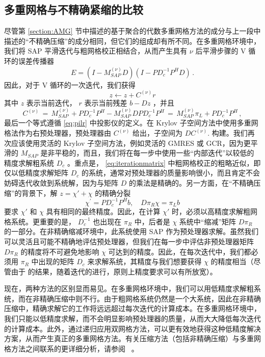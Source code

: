 \documentclass{siamltex}
\newcommand{\MSAP}[1]{M_\mathit{SAP}^{(#1)}}
\newcommand{\MSAPone}{M_\mathit{SAP}}
\begin{document}
\subsection{多重网格与不精确紧缩的比较  }       \label{sec:MGvsID}    尽管第    \ref{section:AMG}    节中描述的基于聚合的代数多重网格方法的成分与上一段中描述的“不精确压缩”的成分相同，但它们的组成却有所不同。在多重网格环境中，我们将 SAP 平滑迭代与粗网格校正相结合，从而产生具有    $\nu$    后平滑步骤的 V 循环的误差传播器
\begin{equation*}
  E = (I - \MSAP{\nu} D)( I - P D_c^{-1} P^H D )\,.
\end{equation*}    因此，对于 V 循环的一次迭代，我们获得
\begin{equation*}
  z \leftarrow z+C^{(\nu)}r
\end{equation*}    其中    $z$    表示当前迭代，   $r$    表示当前残差    $b-Dz$    ，并且
\begin{equation} \label{eq:iterationmatrix}
  C^{(\nu)} \, = \, \MSAP{\nu} + P D_c^{-1} P^{H} - \MSAP{\nu} D P D_c^{-1} P^{H} \, = \, \MSAP{\nu} \pi_L + P D_c^{-1} P^{H}\,,
\end{equation}    最后一个等式遵循    \eqref{eq:pilr}    中投影仪的定义。在 Krylov 子空间方法中使用多重网格法作为右预处理器，预处理器由    $C^{(\nu)}$    给出，子空间为    $DC^{(\nu)}.$    构建。我们再次应该使用灵活的 Krylov 子空间方法，例如灵活的 GMRES 或 GCR，因为更平滑的    $\MSAPone$    是非平稳的，而且，我们将在每一步中使用一些“内部迭代”以较低的精度求解粗系统    $D_c$   。重点是，   \eqref{eq:iterationmatrix}    中粗网格校正的粗略近似，即仅以低精度求解矩阵    $D_c$    的系统，通常对预处理器的质量影响很小，而且肯定不会妨碍迭代收敛到系统解，因为与矩阵    $D$    的乘法是精确的。另一方面，在“不精确压缩”的背景下，解    $z = \chi' + \chi$    的精确分裂
\[
  \chi^{\prime} = PD_{c}^{-1}P^{H}b, \quad D \pi_R \chi = \pi_{L} b
\]    要求    $\chi'$    和    $\chi$    具有相同的最终精度。因此，在计算    $\chi'$    时，必须以高精度求解粗网格系统。更重要的是，   $D_c^{-1}$    也出现在    $\pi_R$    中，后者是    $\chi$    系统中“缩减”矩阵    $D\pi_R$    的一部分。在非精确缩减环境中，此系统使用 SAP 作为预处理器求解。虽然我们可以灵活且可能不精确地评估预处理器，但我们在每一步中评估非预处理器矩阵    $D \pi_R$    的精度将不可避免地影响    $\chi$    可达到的精度。因此，在每次迭代中，我们都必须用    $\pi_R$    中出现的矩阵    $D_c$    来求解系统，其精度与我们想要获得    $\chi$    的精度相当（尽管由于    \cite{SiSz03,EshofSlei04}    的结果，随着迭代的进行，原则上精度要求可以有所放宽）。

现在，两种方法的区别显而易见。在多重网格环境中，我们可以用低精度求解粗系统，而在非精确压缩中则不行。由于粗网格系统仍然是一个大系统，因此在非精确压缩中，精确求解它的工作将远远超过每次迭代的计算成本。在多重网格环境中，我们只能以低精度求解，而不会明显影响预处理器的质量，从而大大降低每次迭代的计算成本。此外，通过递归应用双网格方法，可以更有效地获得这种低精度解决方案，从而产生真正的多重网格方法。有关压缩方法（包括非精确压缩）与多重网格方法之间联系的更详细分析，请参阅~    \cite{Kahl-Rittich-preprint,Rittich2011,Tang:2010:CTP:1958286.1958296}    。
\end{document}
